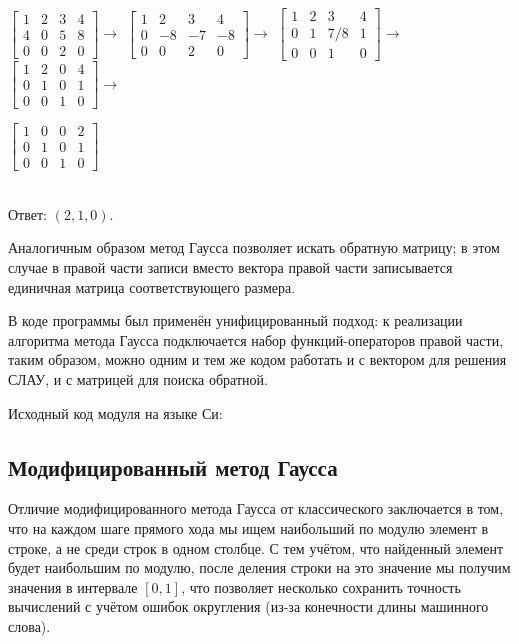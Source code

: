 \documentclass[a4paper,11pt]{report}
\begin{document}
$
\left[
\begin{array}{ccc|c}
 1 & 2 & 3 & 4 \\
 4 & 0 & 5 & 8 \\
 0 & 0 & 2 & 0 
\end{array}
\right] \rightarrow
$
$
\left[
\begin{array}{ccc|c}
 1 & 2 & 3 & 4 \\
 0 & -8 & -7 & -8 \\
 0 & 0 & 2 & 0 
\end{array}
\right] \rightarrow
$
$
\left[
\begin{array}{ccc|c}
 1 & 2 & 3 & 4 \\
 0 & 1 & 7/8 & 1 \\
 0 & 0 & 1 & 0 
\end{array}
\right] \rightarrow
$
$
\left[
\begin{array}{ccc|c}
 1 & 2 & 0 & 4 \\
 0 & 1 & 0 & 1 \\
 0 & 0 & 1 & 0 
\end{array}
\right] \rightarrow
$


$
\left[
\begin{array}{ccc|c}
 1 & 0 & 0 & 2 \\
 0 & 1 & 0 & 1 \\
 0 & 0 & 1 & 0 
\end{array}
\right]
$

~\\
Ответ: $(2, 1, 0)$.

Аналогичным образом метод Гаусса позволяет искать обратную матрицу; в этом случае в правой части записи вместо вектора правой
части записывается единичная матрица соответствующего размера.

В коде программы был применён унифицированный подход: к реализации алгоритма метода Гаусса подключается набор функций-операторов
правой части, таким образом, можно одним и тем же кодом работать и с вектором для решения СЛАУ, и с матрицей для поиска обратной.

Исходный код модуля на языке Си:



\subsection*{Модифицированный метод Гаусса}
Отличие модифицированного метода Гаусса от классического заключается в том, что на каждом шаге прямого хода мы ищем наибольший по
модулю элемент в строке, а не среди строк в одном столбце. С тем учётом, что найденный элемент будет наибольшим по модулю, после
деления строки на это значение мы получим значения в интервале $[0, 1]$, что позволяет несколько сохранить точность вычислений с 
учётом ошибок округления (из-за конечности длины машинного слова).
\end{document}
